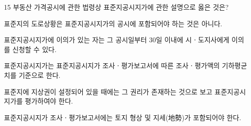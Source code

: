 \begin{question}{15}
부동산 가격공시에 관한 법령상 표준지공시지가에 관한 설명으로 옳은 것은?
\begin{choices}
  \item 표준지의 도로상황은 표준지공시지가의 공시에 포함되어야 하는 것은 아니다.
  \item 표준지공시지가에 이의가 있는 자는 그 공시일부터 30일 이내에 시ㆍ도지사에게 이의를 신청할 수 있다.
  \item 표준지공시지가는 표준지공시지가 조사ㆍ평가보고서에 따른 조사ㆍ평가액의 기하평균치를 기준으로 한다.
  \item 표준지에 지상권이 설정되어 있을 때에는 그 권리가 존재하는 것으로 보고 표준지공시지가를 평가하여야 한다.
  \item 표준지공시지가 조사ㆍ평가보고서에는 토지 형상 및 지세(地勢)가 포함되어야 한다.
\end{choices}
\end{question}

